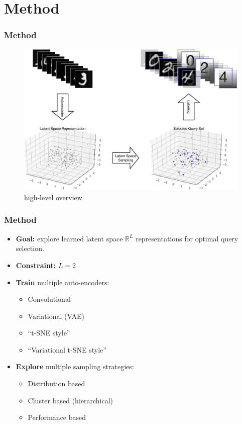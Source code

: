 \documentclass[10pt, usenames, dvipsnames, table]{beamer}
\begin{document}
\section{Method}
\label{sec:method}

\begin{frame}
  \frametitle{Method}
  \begin{figure}
    \centering
    \includegraphics[width=0.8\linewidth]{docs/overview}
    \caption{high-level overview}
    \label{fig:overview}
  \end{figure}
\end{frame}

\begin{frame}
  \frametitle{Method}
  \begin{itemize}
  \item \textbf{Goal:} explore learned latent space $\mathbb{R}^L$
    representations for optimal query selection. \pause{}
  \item \textbf{Constraint:} $L = 2$ \pause{}
  \item \textbf{Train} multiple auto-encoders:
    \begin{itemize}
    \item Convolutional \cite{krizhevsky_imagenet_2012}
    \item Variational (VAE) \cite{kingma_auto-encoding_2013}
    \item ``t-SNE style'' \cite{maaten_learning_2009}
    \item ``Variational t-SNE style''
    \end{itemize}
    \pause{}
  \item \textbf{Explore} multiple sampling strategies:
    \begin{itemize}
    \item Distribution based
    \item Cluster based (hierarchical)
    \item Performance based
    \end{itemize}
  \end{itemize}
\end{frame}
\end{document}
